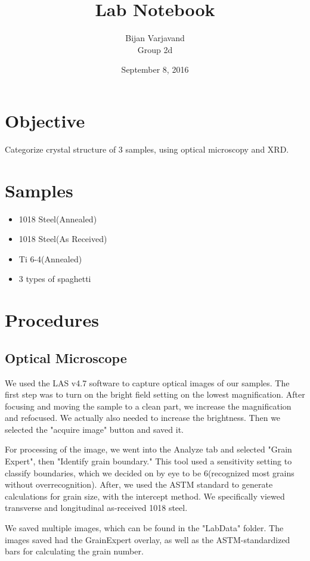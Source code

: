 \documentclass{article}
\author{Bijan Varjavand\\Group 2d}
\title{Lab Notebook}
\date{September 8, 2016}
\begin{document}
\maketitle

\section{Objective}
Categorize crystal structure of 3 samples, using optical microscopy and XRD.

\section{Samples}
\begin{itemize}
 \item 1018 Steel(Annealed)
 \item 1018 Steel(As Received)
 \item Ti 6-4(Annealed)
 \item 3 types of spaghetti
\end{itemize}

\section{Procedures}

\subsection{Optical Microscope}
We used the LAS v4.7 software to capture optical images of our samples. The first step was to turn on the bright field setting on the lowest magnification. After focusing and moving the sample to a clean part, we increase the magnification and refocused. We actually also needed to increase the brightness. Then we selected the "acquire image" button and saved it.

For processing of the image, we went into the Analyze tab and selected "Grain Expert", then "Identify grain boundary." This tool used a sensitivity setting to classify boundaries, which we decided on by eye to be 6(recognized most grains without overrecognition). After, we used the ASTM standard to generate calculations for grain size, with the intercept method. We specifically viewed transverse and longitudinal as-received 1018 steel. 

We saved multiple images, which can be found in the "LabData" folder. The images saved had the GrainExpert overlay, as well as the ASTM-standardized bars for calculating the grain number.
\end{document}

